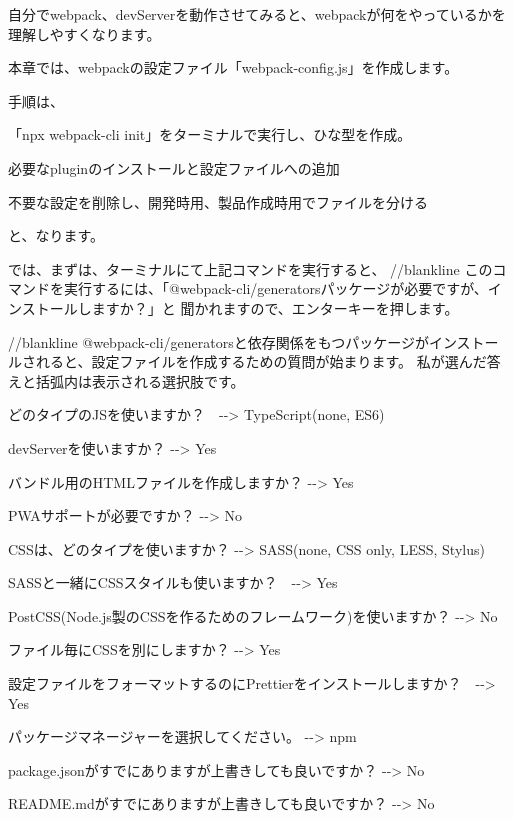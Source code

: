 自分でwebpack、devServerを動作させてみると、webpackが何をやっているかを理解しやすくなります。

本章では、webpackの設定ファイル「webpack{-}config.js」を作成します。

\vspace*{\baselineskip}

手順は、\\[0pt]

\begin{starterenumerate}
\item 「npx webpack{-}cli init」をターミナルで実行し、ひな型を作成。
\item 必要なpluginのインストールと設定ファイルへの追加
\item 不要な設定を削除し、開発時用、製品作成時用でファイルを分ける
\end{starterenumerate}

と、なります。

では、まずは、ターミナルにて上記コマンドを実行すると、
//blankline
このコマンドを実行するには、「@webpack{-}cli/generatorsパッケージが必要ですが、インストールしますか？」と
聞かれますので、エンターキーを押します。

//blankline
@webpack{-}cli/generatorsと依存関係をもつパッケージがインストールされると、設定ファイルを作成するための質問が始まります。
私が選んだ答えと括弧内は表示される選択肢です。

\vspace*{\baselineskip}

\begin{starteritemize}
\item どのタイプのJSを使いますか？　{-}{-}\textgreater{} TypeScript(none, ES6)
\item devServerを使いますか？ {-}{-}\textgreater{} Yes
\item バンドル用のHTMLファイルを作成しますか？ {-}{-}\textgreater{} Yes
\item PWAサポートが必要ですか？ {-}{-}\textgreater{} No
\item CSSは、どのタイプを使いますか？ {-}{-}\textgreater{} SASS(none, CSS only, LESS, Stylus)
\item SASSと一緒にCSSスタイルも使いますか？　{-}{-}\textgreater{} Yes
\item PostCSS(Node.js製のCSSを作るためのフレームワーク)を使いますか？ {-}{-}\textgreater{} No
\item ファイル毎にCSSを別にしますか？ {-}{-}\textgreater{} Yes
\item 設定ファイルをフォーマットするのにPrettierをインストールしますか？　{-}{-}\textgreater{} Yes
\item パッケージマネージャーを選択してください。 {-}{-}\textgreater{} npm
\item package.jsonがすでにありますが上書きしても良いですか？ {-}{-}\textgreater{} No
\item README.mdがすでにありますが上書きしても良いですか？ {-}{-}\textgreater{} No
\end{starteritemize}

